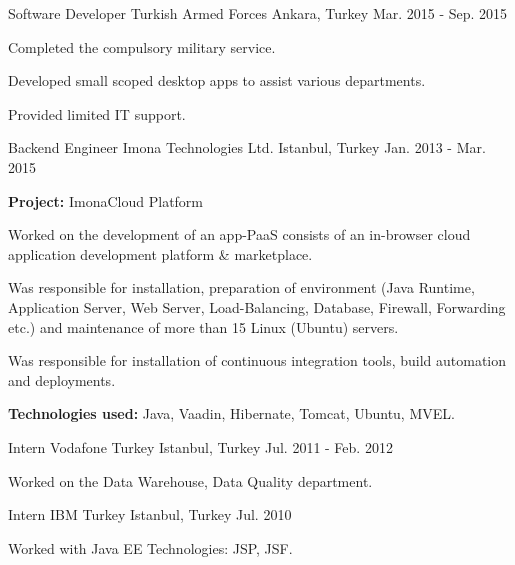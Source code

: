 \begin{cventries}
    \cventry
    {Software Developer}
    {Turkish Armed Forces}
    {Ankara, Turkey}
    {Mar. 2015 - Sep. 2015}
    {
    \begin{cvitems}
        \item{Completed the compulsory military service.}
        \item{Developed small scoped desktop apps to assist various departments.}
        \item{Provided limited IT support.}
    \end{cvitems}
    }

    \cventry
    {Backend Engineer}
    {Imona Technologies Ltd.}
    {Istanbul, Turkey}
    {Jan. 2013 - Mar. 2015}
    {
    \begin{cvitems}
        \item {\textbf{Project:} ImonaCloud Platform}
        \item {Worked on the development of an app-PaaS consists of an in-browser
        cloud application development platform \& marketplace.}
        \item{Was responsible for installation, preparation of environment (Java Runtime, Application Server,
        Web Server, Load-Balancing, Database, Firewall, Forwarding etc.) and
        maintenance of more than 15 Linux (Ubuntu) servers.}
        \item{Was responsible for installation of continuous integration tools, build automation and deployments.}
        \smallskip
        \item {\textbf{Technologies used:} Java, Vaadin, Hibernate, Tomcat, Ubuntu, MVEL.}
    \end{cvitems}
    }

    \cventry
    {Intern}
    {Vodafone Turkey}
    {Istanbul, Turkey}
    {Jul. 2011 - Feb. 2012}
    {
    \begin{cvitems}
        \item {Worked on the Data Warehouse, Data Quality department.}
    \end{cvitems}
    }

    \cventry
    {Intern}
    {IBM Turkey}
    {Istanbul, Turkey}
    {Jul. 2010}
    {
    \begin{cvitems}
        \item {Worked with Java EE Technologies: JSP, JSF.}
    \end{cvitems}
    }

\end{cventries}
